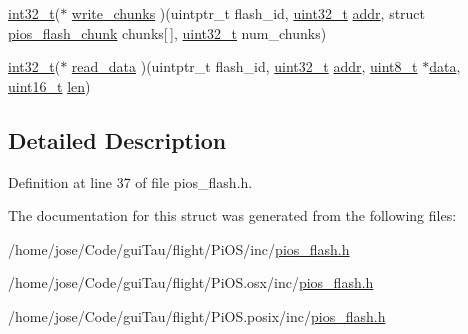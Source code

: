 \begin{DoxyCompactItemize}
\item 
\hyperlink{group___n_a_m_e_gafd12020da5a235dfcf0c3c748fb5baed}{int32\-\_\-t}($\ast$ \hyperlink{group___p_i_o_s___f_l_a_s_h_ga5bac463e83aa46ce41c151c74ff8467b}{write\-\_\-chunks} )(uintptr\-\_\-t flash\-\_\-id, \hyperlink{stdint_8h_a435d1572bf3f880d55459d9805097f62}{uint32\-\_\-t} \hyperlink{group___c_m_s_i_s___core___instruction_interface_gae5c31572d72f992f107a67f7c4e80d5b}{addr}, struct \hyperlink{structpios__flash__chunk}{pios\-\_\-flash\-\_\-chunk} chunks\mbox{[}$\,$\mbox{]}, \hyperlink{stdint_8h_a435d1572bf3f880d55459d9805097f62}{uint32\-\_\-t} num\-\_\-chunks)
\item 
\hyperlink{group___n_a_m_e_gafd12020da5a235dfcf0c3c748fb5baed}{int32\-\_\-t}($\ast$ \hyperlink{group___p_i_o_s___f_l_a_s_h_ga5499ff7cdf896098a6eb43f2f32dc40a}{read\-\_\-data} )(uintptr\-\_\-t flash\-\_\-id, \hyperlink{stdint_8h_a435d1572bf3f880d55459d9805097f62}{uint32\-\_\-t} \hyperlink{group___c_m_s_i_s___core___instruction_interface_gae5c31572d72f992f107a67f7c4e80d5b}{addr}, \hyperlink{stdint_8h_aba7bc1797add20fe3efdf37ced1182c5}{uint8\-\_\-t} $\ast$\hyperlink{pios__opahrs__proto_8h_a20e3f4bfaeccf09a75ef27e095a10112}{data}, \hyperlink{stdint_8h_a273cf69d639a59973b6019625df33e30}{uint16\-\_\-t} \hyperlink{mavlink__helpers_8h_aba59486c1504340293255a065b546e3a}{len})
\end{DoxyCompactItemize}


\subsection{Detailed Description}


Definition at line 37 of file pios\-\_\-flash.\-h.



The documentation for this struct was generated from the following files\-:\begin{DoxyCompactItemize}
\item 
/home/jose/\-Code/gui\-Tau/flight/\-Pi\-O\-S/inc/\hyperlink{inc_2pios__flash_8h}{pios\-\_\-flash.\-h}\item 
/home/jose/\-Code/gui\-Tau/flight/\-Pi\-O\-S.\-osx/inc/\hyperlink{osx_2inc_2pios__flash_8h}{pios\-\_\-flash.\-h}\item 
/home/jose/\-Code/gui\-Tau/flight/\-Pi\-O\-S.\-posix/inc/\hyperlink{posix_2inc_2pios__flash_8h}{pios\-\_\-flash.\-h}\end{DoxyCompactItemize}
